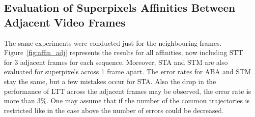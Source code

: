 \subsection{Evaluation of Superpixels Affinities Between Adjacent Video Frames}
The same experiments were conducted just for the neighbouring frames.
Figure~\ref{fig:affin_adj} represents the results for all affinities, now including STT for 3 adjacent frames for each sequence. Moreover, STA and STM are also evaluated for superpixels across 1 frame apart.
The error rates for ABA and STM stay the same, but a few mistakes occur for STA. Also the drop in the performance of LTT across the adjacent frames may be observed, the error rate is more than 3\%. 
One may assume that if the number of the common trajectories is restricted like in the case above the number of errors could be decreased. 
\begin{figure}[htbp]
\centering
\addtolength{\subfigcapskip}{0.07in}
\quad%
\end{figure}
